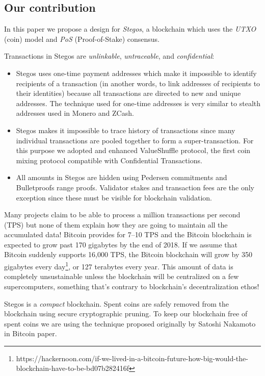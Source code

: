 \documentclass[a4paper, 10pt, conference]{ieeeconf}
\begin{document}
\subsection{Our contribution}
In this paper we propose a design for \textit{Stegos}, a blockchain which uses the \textit{UTXO} (coin) model and \textit{PoS} (Proof-of-Stake) consensus.

Transactions in Stegos are \textit{unlinkable}, \textit{untraceable}, and \textit{confidential}:

\begin{itemize}
	\item {Stegos uses one-time payment addresses which make it impossible to identify recipients of a transaction (in another words, to link addresses of recipients to their identities) because all transactions are directed to new and unique addresses. The technique used for one-time addresses is very similar to stealth addresses used in Monero and ZCash.}
	\item {Stegos makes it impossible to trace history of transactions since many individual transactions are pooled together to form a super-transaction. For this purpose we adopted and enhanced ValueShuffle protocol\cite{c7}, the first coin mixing protocol compatible with Confidential Transactions.}
	\item {All amounts in Stegos are hidden using Pedersen commitments\cite{c8} and Bulletproofs range proofs\cite{c4}. Validator stakes and transaction fees are the only exception since these must be visible for blockchain validation.}
\end{itemize}

Many projects claim to be able to process a million transactions per second (TPS) but none of them explain how they are going to maintain all the accumulated data! Bitcoin provides for 7--10 TPS and the Bitcoin blockchain is expected to grow past 170 gigabytes by the end of 2018. If we assume that Bitcoin suddenly supports 16,000 TPS, the Bitcoin blockchain will grow by 350 gigabytes every day\footnote{https://hackernoon.com/if-we-lived-in-a-bitcoin-future-how-big-would-the-blockchain-have-to-be-bd07b282416f}, or 127 terabytes every year. This amount of data is completely unsustainable unless the blockchain will be centralized on a few supercomputers, something that’s contrary to blockchain’s decentralization ethos!

Stegos is a \textit{compact} blockchain. Spent coins are safely removed from the blockchain using secure cryptographic pruning. To keep our blockchain free of spent coins we are using the technique proposed originally by Satoshi Nakamoto in Bitcoin paper\cite{c1}.
\end{document}
